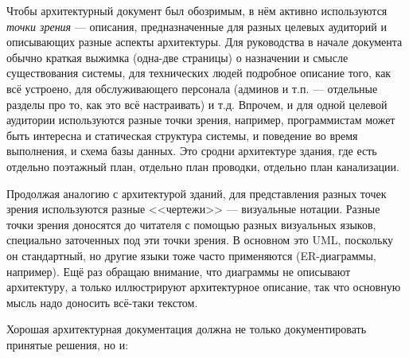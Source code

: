 \documentclass[a5paper]{article}
\begin{document}
Чтобы архитектурный документ был обозримым, в нём активно используются \emph{точки зрения} --- описания, предназначенные для разных целевых аудиторий и описывающих разные аспекты архитектуры. Для руководства в начале документа обычно краткая выжимка (одна-две страницы) о назначении и смысле существования системы, для технических людей подробное описание того, как всё устроено, для обслуживающего персонала (админов и т.п. --- отдельные разделы про то, как это всё настраивать) и т.д. Впрочем, и для одной целевой аудитории используются разные точки зрения, например, программистам может быть интересна и статическая структура системы, и поведение во время выполнения, и схема базы данных. Это сродни архитектуре здания, где есть отдельно поэтажный план, отдельно план проводки, отдельно план канализации.

Продолжая аналогию с архитектурой зданий, для представления разных точек зрения используются разные <<чертежи>> --- визуальные нотации. Разные точки зрения доносятся до читателя с помощью разных визуальных языков, специально заточенных под эти точки зрения. В основном это UML, поскольку он стандартный, но другие языки тоже часто применяются (ER-диаграммы, например). Ещё раз обращаю внимание, что диаграммы не описывают архитектуру, а только иллюстрируют архитектурное описание, так что основную мысль надо доносить всё-таки текстом.

Хорошая архитектурная документация должна не только документировать принятые решения, но и:
\end{document}
